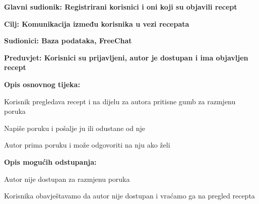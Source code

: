 	
	\noindent {}
	\begin{packed_item}
		
		\item \textbf{Glavni sudionik: Registrirani korisnici i oni koji su objavili recept }
		\item  \textbf{Cilj: Komunikacija između korisnika u vezi recepata} 
		\item  \textbf{Sudionici: Baza podataka, FreeChat} 
		\item  \textbf{Preduvjet: Korisnici su prijavljeni, autor je dostupan i ima objavljen recept} 
		\item  \textbf{Opis osnovnog tijeka:}
		
		\item[] \begin{packed_enum}
			
			\item Korisnik pregledava recept i na dijelu za autora pritisne gumb za razmjenu poruka
			\item Napiše poruku i pošalje ju ili odustane od nje
			\item Autor prima poruku i može odgovoriti na nju ako želi
		\end{packed_enum}
		
		\item  \textbf{Opis mogućih odstupanja:}
		
		\item[] \begin{packed_item}
			
			\item[2.a] Autor nije dostupan za razmjenu poruka
			\item[] \begin{packed_enum}
				
				\item Korisnika obavještavamo da autor nije dostupan i vraćamo ga na pregled recepta
				
			\end{packed_enum}
			
		\end{packed_item}
	\end{packed_item}
	
